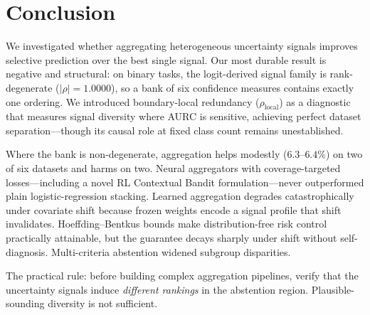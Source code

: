 \documentclass[conference]{IEEEtran}
\newcommand{\rholocal}{\rho_{\mathrm{local}}}
\begin{document}
\section{Conclusion}
\label{sec:conclusion}

We investigated whether aggregating heterogeneous uncertainty signals improves selective prediction over the best single signal. Our most durable result is negative and structural: on binary tasks, the logit-derived signal family is rank-degenerate ($|\rho|{=}1.0000$), so a bank of six confidence measures contains exactly one ordering. We introduced boundary-local redundancy ($\rholocal$) as a diagnostic that measures signal diversity where AURC is sensitive, achieving perfect dataset separation---though its causal role at fixed class count remains unestablished.

Where the bank is non-degenerate, aggregation helps modestly ($6.3$--$6.4\%$) on two of six datasets and harms on two. Neural aggregators with coverage-targeted losses---including a novel RL Contextual Bandit formulation---never outperformed plain logistic-regression stacking. Learned aggregation degrades catastrophically under covariate shift because frozen weights encode a signal profile that shift invalidates. Hoeffding--Bentkus bounds make distribution-free risk control practically attainable, but the guarantee decays sharply under shift without self-diagnosis. Multi-criteria abstention widened subgroup disparities.

The practical rule: before building complex aggregation pipelines, verify that the uncertainty signals induce \emph{different rankings} in the abstention region. Plausible-sounding diversity is not sufficient.



\end{document}
